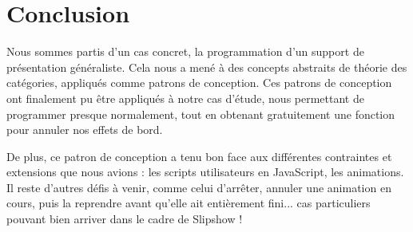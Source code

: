 \documentclass[final]{jflart}
\begin{document}
\section{Conclusion}

Nous sommes partis d'un cas concret, la programmation d'un support de
présentation généraliste. Cela nous a mené à des concepts abstraits de
théorie des catégories, appliqués comme patrons de conception. Ces patrons de
conception ont finalement pu être appliqués à notre cas d'étude, nous permettant de programmer presque normalement, tout en obtenant gratuitement une fonction pour annuler nos effets de bord.

De plus, ce patron de conception a tenu bon face aux différentes contraintes et
extensions que nous avions : les scripts utilisateurs en JavaScript, les
animations. Il reste d'autres défis à venir, comme celui d'arrêter, annuler une animation en cours, puis la reprendre avant qu'elle ait entièrement fini... cas particuliers pouvant bien arriver dans le cadre de Slipshow !



\end{document}
